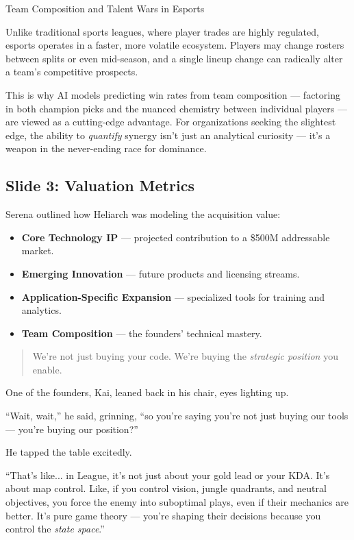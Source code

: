\begin{HistoricalSidebar}{Team Composition and Talent Wars in Esports}
        \medskip
        
        Unlike traditional sports leagues, where player trades are highly regulated, esports operates in a faster, more volatile ecosystem. Players may change rosters between splits or even mid-season, and a single lineup change can radically alter a team’s competitive prospects.
        
        \medskip
        
        This is why AI models predicting win rates from team composition — factoring in both champion picks and the nuanced chemistry between individual players — are viewed as a cutting-edge advantage.  
        For organizations seeking the slightest edge, the ability to \textit{quantify} synergy isn’t just an analytical curiosity — it’s a weapon in the never-ending race for dominance.
\end{HistoricalSidebar}
    
\subsection{Slide 3: Valuation Metrics} 

    Serena outlined how Heliarch was modeling the acquisition value:
    \begin{itemize}
        \item \textbf{Core Technology IP} — projected contribution to a \$500M addressable market.
        \item \textbf{Emerging Innovation} — future products and licensing streams.
        \item \textbf{Application-Specific Expansion} — specialized tools for training and analytics.
        \item \textbf{Team Composition} — the founders’ technical mastery.
    \end{itemize}

\begin{quote}
    We’re not just buying your code. We’re buying the \textit{strategic position} you enable.
\end{quote}

One of the founders, Kai, leaned back in his chair, eyes lighting up.

“Wait, wait,” he said, grinning, “so you’re saying you’re not just buying our tools — you’re buying our position?”

He tapped the table excitedly.

“That’s like... in League, it’s not just about your gold lead or your KDA. It’s about map control. Like, if you control vision, jungle quadrants, and neutral objectives, you force the enemy into suboptimal plays, even if their mechanics are better. It’s pure game theory — you’re shaping their decisions because you control the \textit{state space}.”

